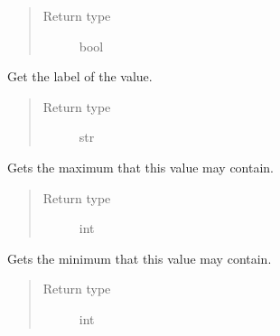 \documentclass[letterpaper,10pt,english]{sphinxmanual}
\begin{document}
\begin{fulllineitems}
\begin{fulllineitems}
\begin{quote}
\begin{description}
\item[{Return type}] \leavevmode
bool

\end{description}\end{quote}

\end{fulllineitems}


\begin{fulllineitems}
\label{value:openzwave.value.ZWaveValue.label}
Get the label of the value.
\begin{quote}\begin{description}
\item[{Return type}] \leavevmode
str

\end{description}\end{quote}

\end{fulllineitems}


\begin{fulllineitems}
\label{value:openzwave.value.ZWaveValue.max}
Gets the maximum that this value may contain.
\begin{quote}\begin{description}
\item[{Return type}] \leavevmode
int

\end{description}\end{quote}

\end{fulllineitems}


\begin{fulllineitems}
\label{value:openzwave.value.ZWaveValue.min}
Gets the minimum that this value may contain.
\begin{quote}\begin{description}
\item[{Return type}] \leavevmode
int

\end{description}\end{quote}

\end{fulllineitems}


\end{fulllineitems}
\end{document}
